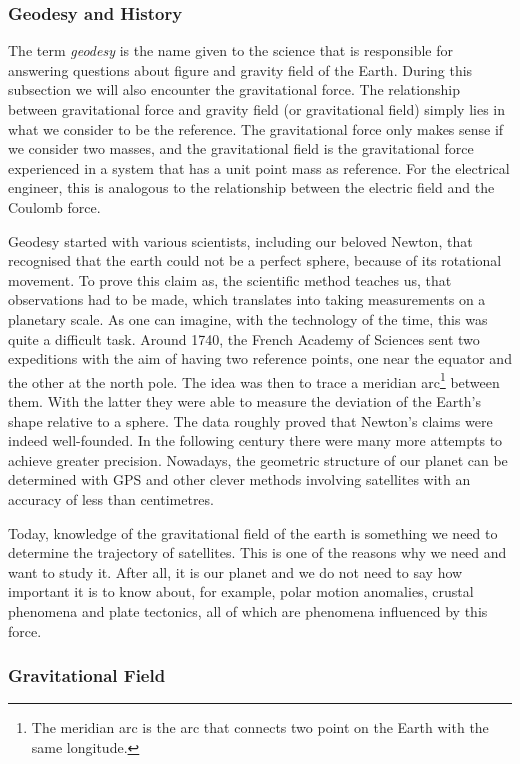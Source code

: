 \subsubsection{Geodesy and History}

The term \emph{geodesy} is the name given to the science that is responsible for
answering questions about figure and gravity field of the Earth. During this
subsection we will also encounter the gravitational force. The relationship
between gravitational force and gravity field (or gravitational field) simply
lies in what we consider to be the reference. The gravitational force only makes
sense if we consider two masses, and the gravitational field is the
gravitational force experienced in a system that has a unit point mass as
reference. For the electrical engineer, this is analogous to the relationship
between the electric field and the Coulomb force.

Geodesy started with various scientists, including our beloved Newton, that
recognised that the earth could not be a perfect sphere, because of its
rotational movement. To prove this claim as, the scientific method teaches us,
that observations had to be made, which translates into taking measurements on a
planetary scale. As one can imagine, with the technology of the time, this was
quite a difficult task. Around 1740, the French Academy of Sciences sent two
expeditions with the aim of having two reference points, one near the equator
and the other at the north pole. The idea was then to trace a meridian
arc\footnote{The meridian arc is the arc that connects two point on the Earth
with the same longitude.} between them. With the latter they were able to
measure the deviation of the Earth's shape relative to a sphere. The data
roughly proved that Newton's claims were indeed well-founded. In the following
century there were many more attempts to achieve greater precision. Nowadays,
the geometric structure of our planet can be determined with GPS and other
clever methods involving satellites with an accuracy of less than centimetres.

Today, knowledge of the gravitational field of the earth is something we need to
determine the trajectory of satellites. This is one of the reasons why we need
and want to study it.  After all, it is our planet and we do not need to say how
important it is to know about, for example, polar motion anomalies, crustal
phenomena and plate tectonics, all of which are phenomena influenced by this
force.

\subsubsection{Gravitational Field}

